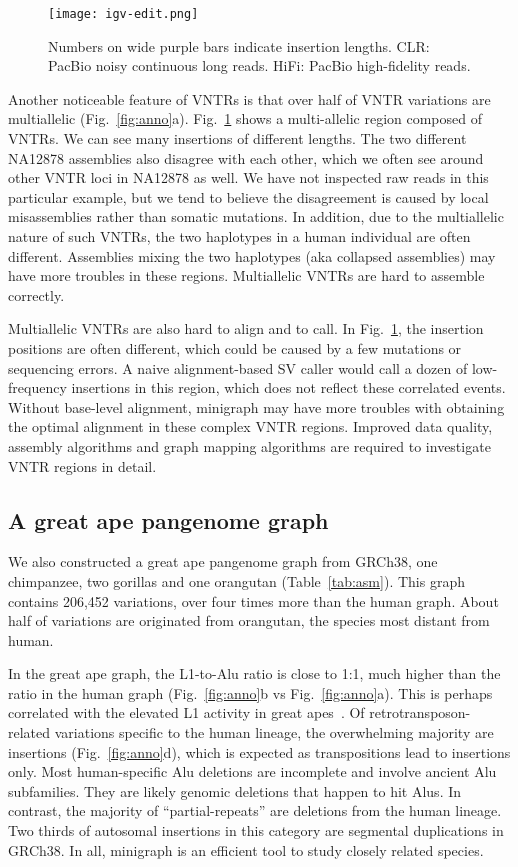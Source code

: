 \documentclass[twocolumn]{bmcart}
\begin{document}
\begin{figure}
\texttt{[image: igv-edit.png]}
\caption{
  Numbers on wide purple bars indicate insertion lengths. CLR: PacBio noisy
  continuous long reads. HiFi: PacBio high-fidelity reads.}\label{fig:igv}
\end{figure}

Another noticeable feature of VNTRs is that over half of VNTR variations are
multiallelic (Fig.~\ref{fig:anno}a). Fig.~\ref{fig:igv} shows a multi-allelic
region composed of VNTRs. We can see many insertions of different lengths. The
two different NA12878 assemblies also disagree with each other, which we often
see around other VNTR loci in NA12878 as well. We have not inspected raw reads
in this particular example, but we tend to believe the disagreement is caused
by local misassemblies rather than somatic mutations. In addition, due to the
multiallelic nature of such VNTRs, the two haplotypes in a human individual are
often different. Assemblies mixing the two haplotypes (aka collapsed
assemblies) may have more troubles in these regions. Multiallelic VNTRs are
hard to assemble correctly.

Multiallelic VNTRs are also hard to align and to call. In Fig.~\ref{fig:igv},
the insertion positions are often different, which could be caused by a few
mutations or sequencing errors. A naive alignment-based SV caller would call a
dozen of low-frequency insertions in this region, which does not reflect these
correlated events. Without base-level alignment, minigraph may
have more troubles with obtaining the optimal alignment in these complex VNTR
regions. Improved data quality, assembly algorithms and graph mapping
algorithms are required to investigate VNTR regions in detail.

\subsection*{A great ape pangenome graph}

We also constructed a great ape pangenome graph from GRCh38, one chimpanzee,
two gorillas and one orangutan (Table~\ref{tab:asm}). This graph contains
206,452 variations, over four times more than the human graph. About half of
variations are originated from orangutan, the species most distant from human.

In the great ape graph, the L1-to-Alu ratio is close to 1:1, much higher than
the ratio in the human graph (Fig.~\ref{fig:anno}b vs Fig.~\ref{fig:anno}a).
This is perhaps correlated with the elevated L1 activity in great
apes~\cite{Mathews:2003aa}. Of retrotransposon-related variations specific to
the human lineage, the overwhelming majority are insertions
(Fig.~\ref{fig:anno}d), which is expected as transpositions lead to insertions
only.  Most human-specific Alu deletions are incomplete and involve ancient Alu
subfamilies. They are likely genomic deletions that happen to hit Alus. In
contrast, the majority of ``partial-repeats'' are deletions from the human
lineage. Two thirds of autosomal insertions in this category are segmental
duplications in GRCh38. In all, minigraph is an efficient tool to study closely
related species.
\end{document}
